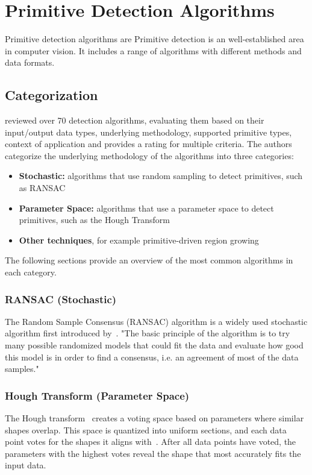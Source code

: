 \chapter{Primitive Detection Algorithms}
Primitive detection algorithms are
Primitive detection is an well-established area in computer vision.
It includes a range of algorithms with different methods and data formats.


\section{Categorization}
\cite{kaiser_survey_2019} reviewed over 70 detection algorithms, evaluating them based on their input/output data types,
underlying methodology, supported primitive types, context of application and provides a rating for multiple criteria.
The authors categorize the underlying methodology of the algorithms into three categories:
\begin{itemize}
    \item \textbf{Stochastic:} algorithms that use random sampling to detect primitives, such as RANSAC
    \item \textbf{Parameter Space:} algorithms that use a parameter space to detect primitives, such as the Hough Transform
    \item \textbf{Other techniques}, for example primitive-driven region growing
\end{itemize}

The following sections provide an overview of the most common algorithms in each category.

\subsection{RANSAC (Stochastic)}
The Random Sample Consensus (RANSAC) algorithm is a widely used stochastic algorithm first introduced by~\cite{fischler_random_1981}.
"The basic principle of the algorithm is to try many possible randomized models that could fit
the data and evaluate how good this model is in order to find a consensus, i.e. an agreement of most of the data samples."~\parencite{kaiser_survey_2019}

\subsection{Hough Transform (Parameter Space)}
The Hough transform~\parencite{hough_method_1962} creates a voting space based on parameters where similar shapes overlap.
This space is quantized into uniform sections, and each data point votes for the shapes it aligns with~\parencite{duda_use_1972}.
After all data points have voted, the parameters with the highest votes reveal the shape that most accurately fits the input data.

